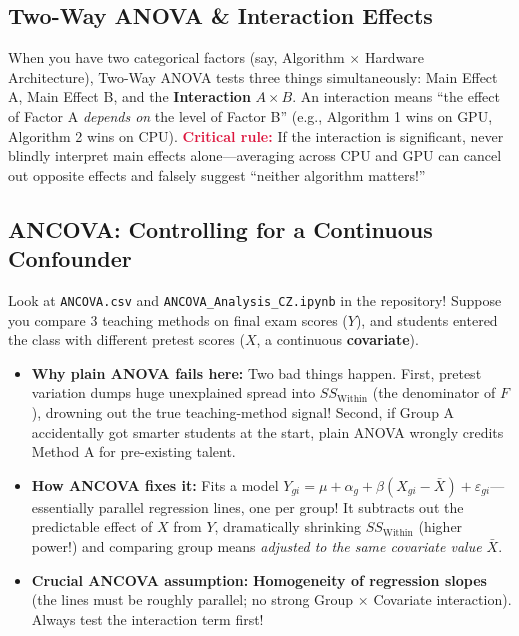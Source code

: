 \documentclass[11pt, a4paper]{article}
\begin{document}
\subsection{Two-Way ANOVA \& Interaction Effects}
When you have two categorical factors (say, Algorithm $\times$ Hardware Architecture), Two-Way ANOVA tests three things simultaneously: Main Effect A, Main Effect B, and the \textbf{Interaction} $A \times B$.
An interaction means ``the effect of Factor A \emph{depends on} the level of Factor B'' (e.g., Algorithm 1 wins on GPU, Algorithm 2 wins on CPU). \textcolor{crimson}{\textbf{Critical rule:}} If the interaction is significant, never blindly interpret main effects alone---averaging across CPU and GPU can cancel out opposite effects and falsely suggest ``neither algorithm matters!''

\subsection{ANCOVA: Controlling for a Continuous Confounder}
Look at \texttt{ANCOVA.csv} and \texttt{ANCOVA\_Analysis\_CZ.ipynb} in the repository! Suppose you compare 3 teaching methods on final exam scores ($Y$), and students entered the class with different pretest scores ($X$, a continuous \textbf{covariate}).
\begin{itemize}
    \item \textbf{Why plain ANOVA fails here:} Two bad things happen. First, pretest variation dumps huge unexplained spread into $SS_{\text{Within}}$ (the denominator of $F$), drowning out the true teaching-method signal! Second, if Group A accidentally got smarter students at the start, plain ANOVA wrongly credits Method A for pre-existing talent.
    \item \textbf{How ANCOVA fixes it:} Fits a model $Y_{gi} = \mu + \alpha_g + \beta (X_{gi} - \bar{X}) + \varepsilon_{gi}$---essentially parallel regression lines, one per group! It subtracts out the predictable effect of $X$ from $Y$, dramatically shrinking $SS_{\text{Within}}$ (higher power!) and comparing group means \emph{adjusted to the same covariate value $\bar{X}$}.
    \item \textbf{Crucial ANCOVA assumption:} \textbf{Homogeneity of regression slopes} (the lines must be roughly parallel; no strong Group $\times$ Covariate interaction). Always test the interaction term first!
\end{itemize}
\end{document}
